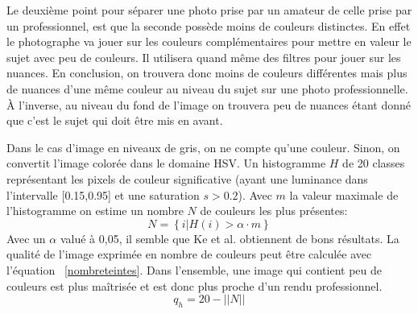 \documentclass[11pt, french,screen]{report-rd-info}
\begin{document}
\begin{description}
Le deuxième point pour séparer une photo prise par un amateur de celle prise par un professionnel, est que la seconde possède moins de couleurs distinctes. En effet le photographe va jouer sur les couleurs complémentaires pour mettre en valeur le sujet avec peu de couleurs. Il utilisera quand même des filtres pour jouer sur les nuances. En conclusion, on trouvera donc moins de couleurs différentes mais plus de nuances d’une même couleur au niveau du sujet sur une photo professionnelle. À l’inverse, au niveau du fond de l’image on trouvera peu de nuances étant donné que c’est le sujet qui doit être mis en avant.

Dans le cas d'image en niveaux de gris, on ne compte qu'une couleur. Sinon, on convertit l'image colorée dans le domaine HSV. Un histogramme $H$ de 20 classes représentant les pixels de couleur significative (ayant une luminance dans l'intervalle [0.15,0.95] et une saturation $s > 0.2$). Avec $m$ la valeur maximale de l'histogramme on estime un nombre $N$ de couleurs les plus présentes: 
\begin{equation}
N = \left\{i|H(i)>\alpha \cdot m\right\}
\end{equation}
Avec un $\alpha$ valué à 0,05, il semble que Ke et al. \cite{Ke} obtiennent de bons résultats. La qualité de l'image exprimée en nombre de couleurs peut être calculée avec l'équation ~\ref{nombreteintes}. Dans l'ensemble, une image qui contient peu de couleurs est plus maîtrisée et est donc plus proche d'un rendu professionnel. 
\begin{equation}
q_h = 20 - ||N||
\label{nombreteintes}
\end{equation}


\end{description}
\end{document}
